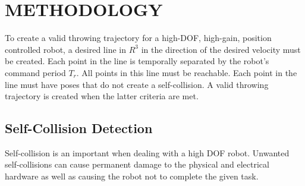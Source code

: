 \section{METHODOLOGY}\label{sec:methodology}
To create a valid throwing trajectory for a high-DOF, high-gain, position controlled robot, a desired line in $R^3$ in the direction of the desired velocity must be created.  Each point in the line is temporally separated by the robot's command period $T_r$.  All points in this line must be reachable.  Each point in the line must have poses that do not create a self-collision.  A valid throwing trajectory is created when the latter criteria are met.

\subsection{Self-Collision Detection}\label{sec:selfCollision}
Self-collision is an important when dealing with a high DOF robot.  Unwanted self-collisions can cause permanent damage to the physical and electrical hardware as well as causing the robot not to complete the given task.

